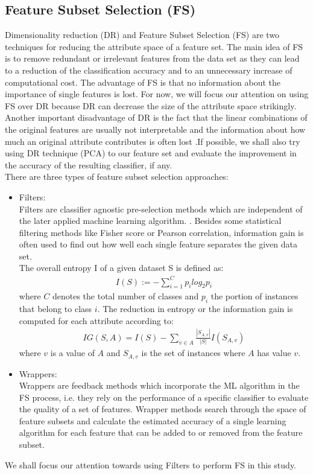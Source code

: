 \documentclass{sig-alternate}
\begin{document}
\subsection{Feature Subset Selection (FS)}
Dimensionality reduction (DR) and Feature Subset Selection (FS) are two techniques for reducing the attribute space of a feature set. The main idea of FS is to remove redundant or irrelevant features from the data set as they can lead to a reduction of the classification accuracy and to an unnecessary increase of computational cost. The advantage of FS is that no information about the importance of single features is lost. For now, we will focus our attention on using FS over DR because DR can decrease the size of the attribute space strikingly. Another important disadvantage of DR is the fact that the linear combinations of the original features are usually not interpretable and the information about how much an original attribute contributes is often lost \cite{mit} .If possible, we shall also try using DR technique (PCA) to our feature set and evaluate the improvement in the accuracy of the resulting classifier, if any.\\
There are three types of feature subset selection approaches:
\begin{itemize}
\item Filters:\\
Filters are classifier agnostic pre-selection methods which are independent of the later
applied machine learning algorithm. . Besides some statistical filtering methods like Fisher score or Pearson correlation, information gain is often used to find out
how well each single feature separates the given data set.\\
The overall entropy I of a given dataset S is defined as:
\begin{align}
I(S) := - \sum_{i=1}^{C} p_i log_2 p_i
\end{align}
where $C$ denotes the total number of classes and $p_i$ the portion of instances that belong to class $i$. The reduction in entropy or the information gain is computed for each attribute according to:
\begin{align}
IG(S,A) = I(S) - \sum_{v \in A} \frac{|S_{A,v}|}{|S|}I(S_{A,v})
\end{align}
where $v$ is a value of $A$ and $S_{A,v}$ is the set of instances where $A$ has value $v$.
\item Wrappers:\\
Wrappers are feedback methods which incorporate the ML algorithm in the FS process,
i.e. they rely on the performance of a specific classifier to evaluate the quality of a set of features. Wrapper methods search through the space of feature subsets and calculate
the estimated accuracy of a single learning algorithm for each feature that can be added
to or removed from the feature subset.
\end{itemize} 
We shall focus our attention towards using Filters to perform FS in this study.
\end{document}
